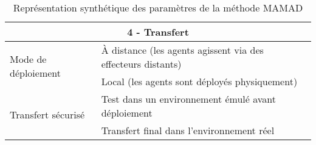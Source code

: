 \begin{table}[h!]
\begin{tabular}{|l|p{10cm}|}
        \multicolumn{2}{|c|}{\textbf{4 - Transfert}}                                                                                          \\ \hline
        \multirow{2}{*}{Mode de déploiement}
                                                & À distance (les agents agissent via des effecteurs distants)                                \\
                                                & Local (les agents sont déployés physiquement)                                               \\ \hline
        \multirow{2}{*}{Transfert sécurisé}
                                                & Test dans un environnement émulé avant déploiement                                          \\
                                                & Transfert final dans l’environnement réel                                                   \\ \hline
    \end{tabular}
    \caption{Représentation synthétique des paramètres de la méthode MAMAD}
    \label{tab:mamad_table_configuration}
\end{table}
